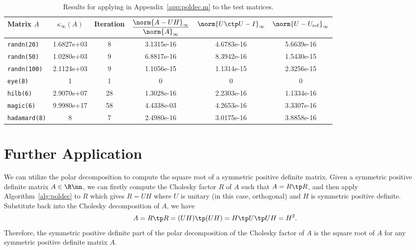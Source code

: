 \documentclass{article}
\numberwithin{equation}{section} %
\newcommand{\gnorm}[1]{\norm{#1}}
\begin{document}
\begin{table}[H]
\centering
\caption{Results for applying  in
  Appendix~\ref{app:poldec.m} to the test matrices.}
\label{tab:numerical-data}
\begin{tabular}{lccccc}
  \toprule 
  {Matrix $A$} & {\(\displaystyle \kappa_\infty(A)\)} & {Iteration} & {\(\displaystyle \frac{\gnorm{A - UH}_\infty}{\gnorm{A}_\infty}\)} & {\(\displaystyle \gnorm{U\ctp U - I}_{\infty}\)} & {$\gnorm{U - U_{\mathrm{ref}}}_{\infty}$}\\
  \toprule 
  \texttt{randn(20)} & 1.6827e+03 & 8 & 3.1315e-16 & 4.6783e-16 & 5.6639e-16 \\
  \midrule 
  \texttt{randn(50)} & 1.0280e+03 & 9 & 6.8817e-16 & 8.3942e-16 & 1.5430e-15\\
  \midrule 
  \texttt{randn(100)} & 2.1124e+03 & 9 & 1.1056e-15 & 1.1314e-15 & 2.3256e-15\\
  \midrule 
  \texttt{eye(8)} & 1 & 1 & 0 & 0 & 0\\
  \midrule 
  \texttt{hilb(6)} & 2.9070e+07 & 28 & 1.3028e-16 & 2.2303e-16 & 1.1334e-16  \\
  \midrule 
  \texttt{magic(6)} & 9.9980e+17 & 58 & 4.4338e-03 & 4.2653e-16 & 3.3307e-16\\
  \midrule 
  \texttt{hadamard(8)} & 8 & 7 & 2.4980e-16 & 3.0175e-16 & 3.8858e-16\\
  \bottomrule
\end{tabular}
\end{table}

\section{Further Application}
We can utilize the polar decomposition to compute the square root of a
symmetric positive definite matrix. Given a symmetric positive definite
matrix $A\in\R\nn$, we can firstly compute the Cholesky factor $R$ of $A$
such that $A = R\tp R$, and then apply Algorithm~\ref{alg:poldec} to $R$
which gives $R = UH$ where $U$ is unitary (in this case, orthogonal) and
$H$ is symmetric positive definite. Substitute back into the Cholesky
decomposition of $A$, we have
\begin{equation}
  \notag 
  A = R\tp R = (UH)\tp (UH) = H\tp U\tp U H = H^2.
\end{equation}
Therefore, the symmetric positive definite part of the polar decomposition
of the Cholesky factor of $A$ is the square root of $A$ for any symmetric
positive definite matrix $A$.
\end{document}
